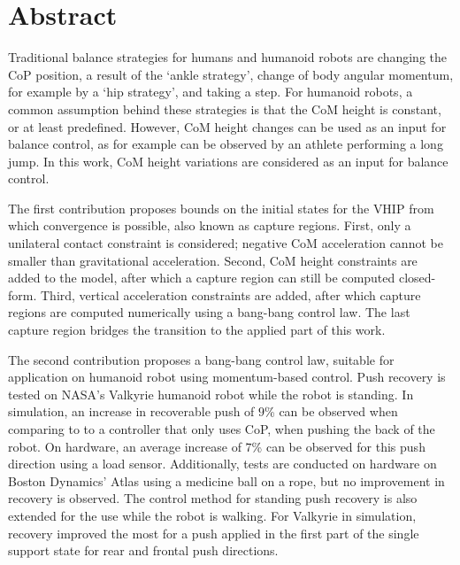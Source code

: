 %
\chapter*{Abstract}%

Traditional balance strategies for humans and humanoid robots are changing the \ac{CoP} position, a result of the `ankle strategy', change of body angular momentum, for example by a `hip strategy', and taking a step. For humanoid robots, a common assumption behind these strategies is that the \ac{CoM} height is constant, or at least predefined. However, \ac{CoM} height changes can be used as an input for balance control, as for example can be observed by an athlete performing a long jump. In this work, \ac{CoM} height variations are considered as an input for balance control. 

The first contribution proposes bounds on the initial states for the \ac{VHIP} from which convergence is possible, also known as capture regions. First, only a unilateral contact constraint is considered; negative \ac{CoM} acceleration cannot be smaller than gravitational acceleration. Second, \ac{CoM} height constraints are added to the model, after which a capture region can still be computed closed-form. Third, vertical acceleration constraints are added, after which capture regions are computed numerically using a bang-bang control law. The last capture region bridges the transition to the applied part of this work.

The second contribution proposes a bang-bang control law, suitable for application on humanoid robot using momentum-based control. Push recovery is tested on NASA's Valkyrie humanoid robot while the robot is standing. In simulation, an increase in recoverable push of $9$\% can be observed when comparing to to a controller that only uses \ac{CoP}, when pushing the back of the robot. On hardware, an average increase of $7$\% can be observed for this push direction using a load sensor. Additionally, tests are conducted on hardware on Boston Dynamics' Atlas using a medicine ball on a rope, but no improvement in recovery is observed. The control method for standing push recovery is also extended for the use while the robot is walking. For Valkyrie in simulation, recovery improved the most for a push applied in the first part of the single support state for rear and frontal push directions. 